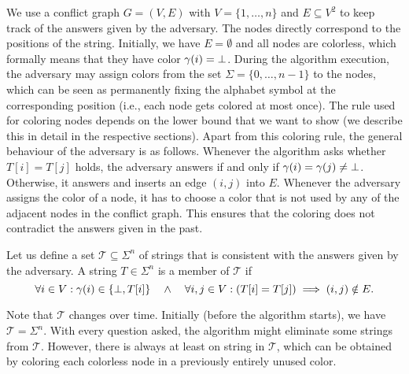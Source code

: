 We use a conflict graph $G = (V, E)$ with $V = \{1, \dots, n\}$ and $E \subseteq V^2$ to keep track of the answers given by the adversary.
The nodes directly correspond to the positions of the string. Initially, we have $E = \emptyset$ and all nodes are colorless, which formally means that they have color $\gamma(i) = \bot$.
During the algorithm execution, the adversary may assign colors from the set $\Sigma = \{0,\dots, n - 1\}$ to the nodes, which can be seen as permanently fixing the alphabet symbol at the corresponding position (i.e., each node gets colored at most once).
The rule used for coloring nodes depends on the lower bound that we want to show (we describe this in detail in the respective sections).
Apart from this coloring rule, the general behaviour of the adversary is as follows.
Whenever the algorithm asks whether $T[i]=T[j]$ holds, the adversary answers  if and only if $\gamma(i) = \gamma(j) \neq \bot$. 
Otherwise, it answers  and inserts an edge $(i, j)$ into $E$.
Whenever the adversary assigns the color of a node, it has to choose a color that is not used by any of the adjacent nodes in the conflict graph. 
This ensures that the coloring does not contradict the answers given in the past.

Let us define a set $\mathcal T \subseteq \Sigma^n$ of strings that is consistent with the answers given by the adversary.
A string $T \in \Sigma^n$ is a member of $\mathcal T$ if
%
$$\forall i \in V : \gamma(i) \in \{\bot, T[i]\} \quad \land \quad \forall i,j \in V: (T[i] = T[j]) \implies  (i, j) \notin E.$$

Note that $\mathcal T$ changes over time. Initially (before the algorithm starts), we have $\mathcal T = \Sigma^n$. 
With every question asked, the algorithm might eliminate some strings from $\mathcal T$.
However, there is always at least on string in $\mathcal T$, which can be obtained by coloring each colorless node in a previously entirely unused color. 


